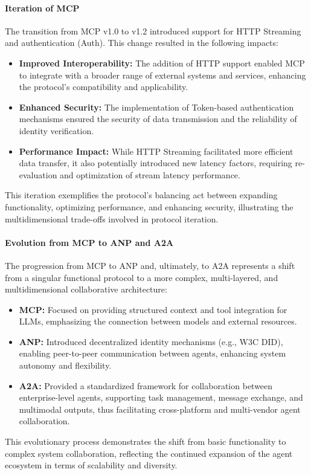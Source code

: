 \documentclass[10pt,preprint]{article}
\begin{document}
\paragraph{Iteration of MCP} The transition from MCP v1.0 to v1.2 introduced support for HTTP Streaming and authentication (Auth). This change resulted in the following impacts: 
\begin{itemize}
    \item \textbf{Improved Interoperability:} The addition of HTTP support enabled MCP to integrate with a broader range of external systems and services, enhancing the protocol's compatibility and applicability.
    \item \textbf{Enhanced Security:} The implementation of Token-based authentication mechanisms ensured the security of data transmission and the reliability of identity verification.
    \item \textbf{Performance Impact:} While HTTP Streaming facilitated more efficient data transfer, it also potentially introduced new latency factors, requiring re-evaluation and optimization of stream latency performance.
\end{itemize}
This iteration exemplifies the protocol's balancing act between expanding functionality, optimizing performance, and enhancing security, illustrating the multidimensional trade-offs involved in protocol iteration.

\paragraph{Evolution from MCP to ANP and A2A} The progression from MCP to ANP and, ultimately, to A2A represents a shift from a singular functional protocol to a more complex, multi-layered, and multidimensional collaborative architecture:
\begin{itemize}
    \item \textbf{MCP:} Focused on providing structured context and tool integration for LLMs, emphasizing the connection between models and external resources.
    \item \textbf{ANP:} Introduced decentralized identity mechanisms (e.g., W3C DID), enabling peer-to-peer communication between agents, enhancing system autonomy and flexibility.
    \item \textbf{A2A:} Provided a standardized framework for collaboration between enterprise-level agents, supporting task management, message exchange, and multimodal outputs, thus facilitating cross-platform and multi-vendor agent collaboration.
\end{itemize}
This evolutionary process demonstrates the shift from basic functionality to complex system collaboration, reflecting the continued expansion of the agent ecosystem in terms of scalability and diversity.
\end{document}
